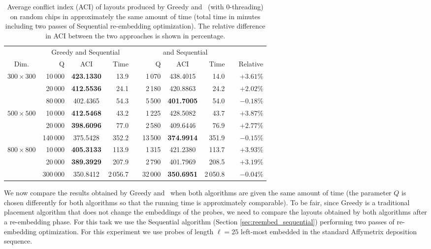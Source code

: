 \begin{table}[t!]\centering
\caption{\label{tab:greedycomp_ci}
  Average conflict index (ACI) of layouts produced by Greedy and \Greedyplus\
  (with $0$-threading) on random chips in approximately the same amount of time
  (total time in minutes including two passes of Sequential re-embedding
  optimization). The relative difference in ACI between the two approaches is
  shown in percentage.}
\footnotesize{
\begin{tabular}{crcrlrcrlr}
\vspace{1pt}
                & \multicolumn{3}{c}{Greedy and Sequential} & & \multicolumn{3}{c}{\Greedyplus\ and Sequential}   \\ \cline{2-4} \cline{6-8}
\vspace{1pt}
Dim.            & Q        & ACI            & Time     & & Q       & ACI            & Time      & & Relative \\
\hline
$300\times 300$ &  10\,000 & {\bf 423.1330} &     13.9 & &  1\,070 &      438.4015  &     14.0 &  & $+3.61\%$ \\
                &  20\,000 & {\bf 412.5536} &     24.1 & &  2\,180 &      420.8863  &     24.2 &  & $+2.02\%$ \\
                &  80\,000 &      402.4365  &     54.3 & &  5\,500 & {\bf 401.7005} &     54.0 &  & $-0.18\%$ \\
\hline
$500\times 500$ &  10\,000 & {\bf 412.5468} &     43.2 & &  1\,225 &      428.5082  &     43.7 &  & $+3.87\%$ \\
                &  20\,000 & {\bf 398.6096} &     77.0 & &  2\,580 &      409.6446  &     76.9 &  & $+2.77\%$ \\
                & 140\,000 &      375.5428  &    352.2 & & 13\,500 & {\bf 374.9914} &    351.9 &  & $-0.15\%$ \\
\hline
$800\times 800$ &  10\,000 & {\bf 405.3133} &    113.9 & &  1\,315 &      421.2380  &    113.7 &  & $+3.93\%$ \\
                &  20\,000 & {\bf 389.3929} &    207.9 & &  2\,790 &      401.7969  &    208.5 &  & $+3.19\%$ \\
                & 300\,000 &      350.8412  & 2\,056.7 & & 32\,000 & {\bf 350.6951} & 2\,050.8 &  & $-0.04\%$ \\
\hline
\end{tabular}}
\end{table}

We now compare the results obtained by Greedy and \Greedyplus\ when both
algorithms are given the same amount of time (the parameter $Q$ is chosen
differently for both algorithms so that the running time is approximately
comparable). To be fair, since Greedy is a traditional placement algorithm that
does not change the embeddings of the probes, we need to compare the layouts
obtained by both algorithms after a re-embedding phase. For this task we use the
Sequential algorithm (Section \ref{sec:reembed_sequential}) performing two
passes of re-embedding optimization. For this experiment we use probes of length
$\ell=25$ left-most embedded in the standard Affymetrix deposition sequence.

